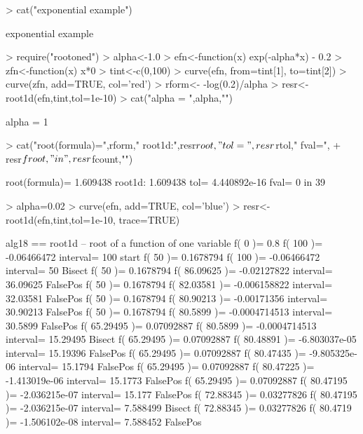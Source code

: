 \documentclass[11pt,letterpaper]{article}
\begin{document}
\begin{Schunk}
\begin{Sinput}
> cat("exponential example\n")
\end{Sinput}
\begin{Soutput}
exponential example
\end{Soutput}
\begin{Sinput}
> require("rootoned")
> alpha<-1.0
> efn<-function(x) { exp(-alpha*x) - 0.2 }
> zfn<-function(x) { x*0 }
> tint<-c(0,100)
> curve(efn, from=tint[1], to=tint[2])
> curve(zfn, add=TRUE, col='red')
> rform<- -log(0.2)/alpha
> resr<-root1d(efn,tint,tol=1e-10)
> cat("alpha = ",alpha,"\n")
\end{Sinput}
\begin{Soutput}
alpha =  1 
\end{Soutput}
\begin{Sinput}
> cat("root(formula)=",rform,"  root1d:",resr$root," tol=",resr$rtol,"  fval=",
+          resr$froot,"  in   ",resr$fcount,"\n\n") 
\end{Sinput}
\begin{Soutput}
root(formula)= 1.609438   root1d: 1.609438  tol= 4.440892e-16   fval= 0   in    39 
\end{Soutput}
\begin{Sinput}
> alpha=0.02
> curve(efn, add=TRUE, col='blue')
> resr<-root1d(efn,tint,tol=1e-10, trace=TRUE)
\end{Sinput}
\begin{Soutput}
alg18 == root1d -- root of a function of one variable
f( 0 )= 0.8   f( 100 )= -0.06466472   interval= 100    start 
f( 50 )= 0.1678794   f( 100 )= -0.06466472   interval= 50    Bisect 
f( 50 )= 0.1678794   f( 86.09625 )= -0.02127822   interval= 36.09625    FalsePos 
f( 50 )= 0.1678794   f( 82.03581 )= -0.006158822   interval= 32.03581    FalsePos 
f( 50 )= 0.1678794   f( 80.90213 )= -0.00171356   interval= 30.90213    FalsePos 
f( 50 )= 0.1678794   f( 80.5899 )= -0.0004714513   interval= 30.5899    FalsePos 
f( 65.29495 )= 0.07092887   f( 80.5899 )= -0.0004714513   interval= 15.29495    Bisect 
f( 65.29495 )= 0.07092887   f( 80.48891 )= -6.803037e-05   interval= 15.19396    FalsePos 
f( 65.29495 )= 0.07092887   f( 80.47435 )= -9.805325e-06   interval= 15.1794    FalsePos 
f( 65.29495 )= 0.07092887   f( 80.47225 )= -1.413019e-06   interval= 15.1773    FalsePos 
f( 65.29495 )= 0.07092887   f( 80.47195 )= -2.036215e-07   interval= 15.177    FalsePos 
f( 72.88345 )= 0.03277826   f( 80.47195 )= -2.036215e-07   interval= 7.588499    Bisect 
f( 72.88345 )= 0.03277826   f( 80.4719 )= -1.506102e-08   interval= 7.588452    FalsePos 

\end{Soutput}
\end{Schunk}
\end{document}
